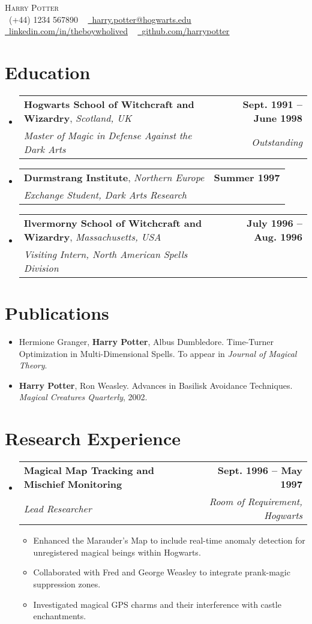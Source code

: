 \documentclass[letterpaper,11pt]{article}
\makeatletter
\newcommand{\resumeSubHeadingListStart}{\begin{itemize}[leftmargin=0.0in, label={}]}
\newcommand{\resumeSubHeadingListEnd}{\end{itemize}}
\newcommand{\resumeItemListStart}{\begin{itemize}[leftmargin=11pt, rightmargin=-9pt]}
\newcommand{\resumeItemListEnd}{\end{itemize}\vspace{-5pt}}
\newcommand{\resumePublicationListStart}{\begin{itemize}[leftmargin=11pt]}
\newcommand{\resumePublicationListEnd}{\end{itemize}\vspace{-10pt}}
\newcommand{\resumeSubheading}[4]{
  \vspace{-2pt}\item
    \begin{tabular*}{1.0\textwidth}[t]{l@{\extracolsep{\fill}}r}
      \textbf{#1} & \textbf{\small #2} \\
      \textit{\small#3} & \textit{\small #4} \\
    \end{tabular*}\vspace{-7pt}
}
\newcommand{\resumeEducationSubheading}[5]{
  \vspace{-2pt}\item
    \begin{tabular*}{1.0\textwidth}[t]{l@{\extracolsep{\fill}}r}
      \textbf{#1}, \textit{\small#2} & \textbf{\small #3} \\
      \textit{\small#4} & \textit{\small #5} \\
    \end{tabular*}\vspace{-9pt}
}
\newcommand{\resumeItem}[1]{
  \item\small{
    {#1 \vspace{-2pt}}
  }
}
\newcommand{\resumePublicationItem}[1]{
  \item\small{
    {#1 \vspace{-7pt}}
  }
}
\makeatother
\begin{document}
\begin{center}
    {\Huge \scshape Harry Potter} \\
    \vspace{1pt}
    \small \raisebox{-0.1\height}\faPhone\ (+44) 1234 567890
    ~ 
    \href{mailto:harry.potter@hogwarts.edu}{\raisebox{-0.2\height}\faEnvelope\  \underline{harry.potter@hogwarts.edu}} 
    ~ 
    \href{https://linkedin.com/in/theboywholived}{\raisebox{-0.2\height}\faLinkedin\ \underline{linkedin.com/in/theboywholived}}  
    ~ 
    \href{https://github.com/harrypotter}{\raisebox{-0.2\height}\faGithub\ \underline{github.com/harrypotter}}
    \vspace{-8pt}
\end{center}

\section{Education}
  \resumeSubHeadingListStart
    \resumeEducationSubheading
        {Hogwarts School of Witchcraft and Wizardry}{Scotland, UK}{Sept. 1991 -- June 1998}
        {Master of Magic in Defense Against the Dark Arts}{Outstanding}
    \resumeEducationSubheading
        {Durmstrang Institute}{Northern Europe}{Summer 1997}
        {Exchange Student, Dark Arts Research}{}
    \resumeEducationSubheading
        {Ilvermorny School of Witchcraft and Wizardry}{Massachusetts, USA}{July 1996 -- Aug. 1996}
        {Visiting Intern, North American Spells Division}{}
  \resumeSubHeadingListEnd

\section{Publications}
  \resumePublicationListStart
    \resumePublicationItem{Hermione Granger, \textbf{Harry Potter}, Albus Dumbledore. Time-Turner Optimization in Multi-Dimensional Spells. To appear in \textit{Journal of Magical Theory}.}
    \resumePublicationItem{\textbf{Harry Potter}, Ron Weasley. Advances in Basilisk Avoidance Techniques. \textit{Magical Creatures Quarterly}, 2002.}
  \resumePublicationListEnd

\section{Research Experience}
    \resumeSubHeadingListStart
        \resumeSubheading{Magical Map Tracking and Mischief Monitoring}{Sept. 1996 -- May 1997}{Lead Researcher}{Room of Requirement, Hogwarts}
      \resumeItemListStart
        \resumeItem{Enhanced the Marauder’s Map to include real-time anomaly detection for unregistered magical beings within Hogwarts.}
        \resumeItem{Collaborated with Fred and George Weasley to integrate prank-magic suppression zones.}
        \resumeItem{Investigated magical GPS charms and their interference with castle enchantments.}
      \resumeItemListEnd
    \resumeSubHeadingListEnd
    
\end{document}
